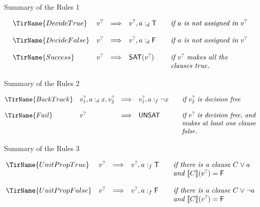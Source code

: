 \documentclass[xetex,aspectratio=169,14pt,hyperref={pdfpagelabels=true,pdflang={en-GB}}]{beamer}
\begin{document}
\begin{frame}
  {Summary of the Rules 1}

  \begin{displaymath}
    \begin{array}{@{}llcl@{\qquad}l}
      \TirName{DecideTrue}    & v^? & \Longrightarrow & v^?, a \decideto \true & \textit{if $a$ is not assigned in $v^?$} \\
      \\
      \TirName{DecideFalse}   & v^? & \Longrightarrow & v^?, a \decideto \false & \textit{if $a$ is not assigned in $v^?$} \\
      \\
      \TirName{Success}       & v^? & \Longrightarrow & \mathsf{SAT}(v^?) & \textit{if $v^?$ makes all the} \\
      &&&&\textit{clauses true.} \\
  \end{array}
\end{displaymath}
\end{frame}

\begin{frame}
  {Summary of the Rules 2}

  \begin{displaymath}
    \begin{array}{@{}llcl@{\qquad}l}
      \TirName{BackTrack}     & v_1^?, a \decideto x, v_2^? & \Longrightarrow & v_1^?, a \forcedto \lnot x & \textit{if $v_2^?$ is decision free} \\
      \\
      \TirName{Fail}          & v^? & \Longrightarrow & \mathsf{UNSAT} & \textit{if $v^?$ is decision free, and}\\
                              &&&&\textit{makes at least one clause}\\
      &&&&\textit{false.} \\
  \end{array}
\end{displaymath}
\end{frame}

\begin{frame}
  {Summary of the Rules 3}

  \begin{displaymath}
    \begin{array}{@{}llcl@{\qquad}l}
      \TirName{UnitPropTrue}  & v^? & \Longrightarrow & v^?, a \forcedto \true & \textit{if there is a clause $C \lor a$}\\
      &&&&\textit{and $\sem{C}(v^?) = \false$} \\
      \\
      \TirName{UnitPropFalse} & v^? & \Longrightarrow & v^?, a \forcedto \false & \textit{if there is a clause $C \lor \lnot a$}\\
      &&&&\textit{and $\sem{C}(v^?) = \false$} \\
  \end{array}
\end{displaymath}
\end{frame}
\end{document}
